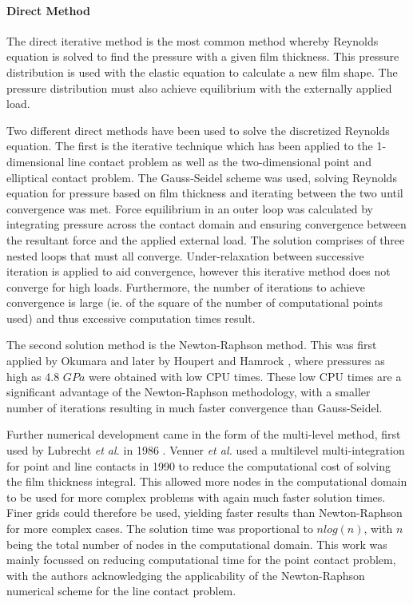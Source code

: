 \paragraph{Direct Method}

The direct iterative method is the most common method whereby Reynolds equation is solved to find the pressure with a given film thickness. This pressure distribution is used with the elastic equation to calculate a new film shape. The pressure distribution must also achieve equilibrium with the externally applied load.

Two different direct methods have been used to solve the discretized Reynolds equation. The first is the iterative technique which has been applied to the 1-dimensional line contact problem \cite{Hamrock1984} as well as the two-dimensional point \cite{Hamrock1976a} and elliptical \cite{Chittenden1985} contact problem. The Gauss-Seidel scheme was used, solving Reynolds equation for pressure based on film thickness and iterating between the two until convergence was met. Force equilibrium in an outer loop was calculated by integrating pressure across the contact domain and ensuring convergence between the resultant force and the applied external load. The solution comprises of three nested loops that must all converge. Under-relaxation between successive iteration is applied to aid convergence, however this iterative method does not converge for high loads. Furthermore, the number of iterations to achieve convergence is large (ie. of the square of the number of computational points used) and thus excessive computation times result.

The second solution method is the Newton-Raphson method. This was first applied by Okumara \cite{Okumara1982} and later by Houpert and Hamrock \cite{Houpert1985}, where pressures as high as 4.8 $GPa$ were obtained with low CPU times. These low CPU times are a significant advantage of the Newton-Raphson methodology, with a smaller number of iterations resulting in much faster convergence than Gauss-Seidel.

Further numerical development came in the form of the multi-level method, first used by Lubrecht \textit{et al.} in 1986 \cite{Lubrecht1986}. Venner \textit{et al.} \cite{Venner1990} used a multilevel multi-integration for point and line contacts in 1990 to reduce the computational cost of solving the film thickness integral. This allowed more nodes in the computational domain to be used for more complex problems with again much faster solution times. Finer grids could therefore be used, yielding faster results than Newton-Raphson for more complex cases. The solution time was proportional to $n log(n)$, with $n$ being the total number of nodes in the computational domain. This work was mainly focussed on reducing computational time for the point contact problem, with the authors acknowledging the applicability of the Newton-Raphson numerical scheme for the line contact problem.

